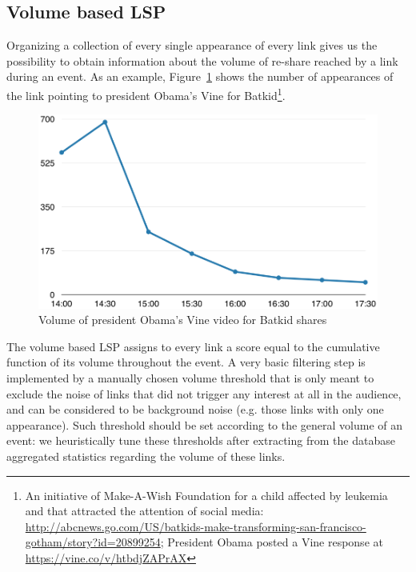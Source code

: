 \documentclass{sig-alternate-somus}
\begin{document}
\subsection{Volume based LSP}
\label{sec:volume_based_links_selection}
Organizing a collection of every single appearance of every link gives us the possibility to obtain information about the volume of re-share reached by a link during an event. As an example, Figure~\ref{fig:batkid_whitehouse_volume} shows the number of appearances of the link pointing to president Obama's Vine for Batkid\footnote{An initiative of Make-A-Wish Foundation for a child affected by leukemia and that attracted the attention of social media: \url{http://abcnews.go.com/US/batkids-make-transforming-san-francisco-gotham/story?id=20899254}; President Obama posted a Vine response at \url{https://vine.co/v/htbdjZAPrAX}}.
\begin{figure}[htbp]
  \centering
  \includegraphics[width=\linewidth]{Figures/batkid_whitehouse_volume.png}
  \caption{Volume of president Obama's Vine video for Batkid shares}
  \label{fig:batkid_whitehouse_volume}
\end{figure}

The volume based LSP assigns to every link a score equal to the cumulative function of its volume throughout the event. A very basic filtering step is implemented by a manually chosen volume threshold that is only meant to exclude the noise of links that did not trigger any interest at all in the audience, and can be considered to be background noise (e.g. those links with only one appearance). Such threshold should be set according to the general volume of an event: we heuristically tune these thresholds after extracting from the database aggregated statistics regarding the volume of these links.
\end{document}
